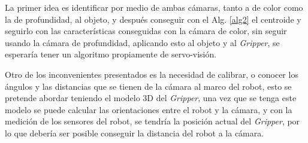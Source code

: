 La primer idea es identificar por medio de ambas cámaras, tanto a de color como la de profundidad, al objeto, y después conseguir con el Alg. \ref{alg2} el centroide y seguirlo con las características conseguidas con la cámara de color, sin seguir usando la cámara de profundidad, aplicando esto al objeto y al \textit{Gripper}, se esperaría tener un algoritmo propiamente de servo-visión.

Otro de los inconvenientes presentados es la necesidad de calibrar, o conocer los ángulos y las distancias que se tienen de la cámara al marco del robot, esto se pretende abordar teniendo el modelo 3D del \textit{Gripper}, una vez que se tenga este modelo se puede calcular las orientaciones entre el robot y la cámara, y con la medición de los sensores del robot, se tendría la posición actual del \textit{Gripper}, por lo que debería ser posible conseguir la distancia del robot a la cámara.






